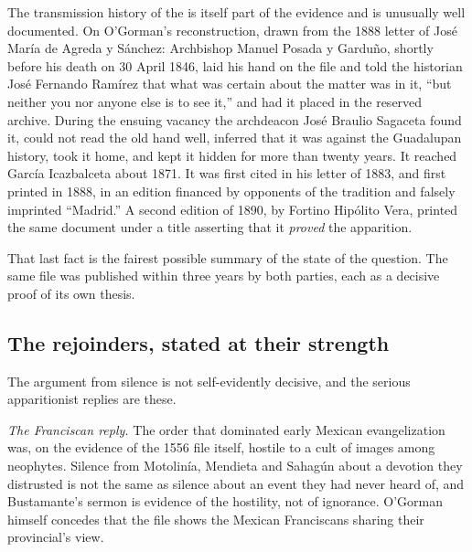The transmission history of the  is itself part
of the evidence and is unusually well documented. On O'Gorman's
reconstruction, drawn from the 1888 letter of Jos\'e Mar\'ia de
Agreda y S\'anchez: Archbishop Manuel Posada y Gardu\~no, shortly
before his death on 30 April 1846, laid his hand on the file and told
the historian Jos\'e Fernando Ram\'irez that what was certain about
the matter was in it, ``but neither you nor anyone else is to see
it,'' and had it placed in the reserved archive. During the ensuing
vacancy the archdeacon Jos\'e Braulio Sagaceta found it, could not
read the old hand well, inferred that it was against the Guadalupan
history, took it home, and kept it hidden for more than twenty years.
It reached Garc\'ia Icazbalceta about 1871. It was first cited in his
letter of 1883, and first printed in 1888, in an edition financed by
opponents of the tradition and falsely imprinted ``Madrid.'' A second
edition of 1890, by Fortino Hip\'olito Vera, printed the same
document under a title asserting that it \emph{proved} the
apparition.

That last fact is the fairest possible summary of the state of the
question. The same file was published within three years by both
parties, each as a decisive proof of its own thesis.

\subsection{The rejoinders, stated at their strength}

The argument from silence is not self-evidently decisive, and the
serious apparitionist replies are these.

\emph{The Franciscan reply.} The order that dominated early Mexican
evangelization was, on the evidence of the 1556 file itself, hostile
to a cult of images among neophytes. Silence from Motolin\'ia,
Mendieta and Sahag\'un about a devotion they distrusted is not the
same as silence about an event they had never heard of, and
Bustamante's sermon is evidence of the hostility, not of ignorance.
O'Gorman himself concedes that the file shows the Mexican Franciscans
sharing their provincial's view.

